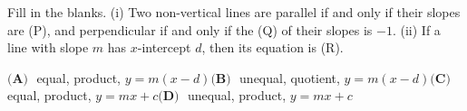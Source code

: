 Fill in the blanks. (i) Two non-vertical lines are parallel if and only if their slopes are (P)\underline{\hspace{1.5cm}}, and perpendicular if and only if the (Q)\underline{\hspace{1.5cm}} of their slopes is $-1$. (ii) If a line with slope $m$ has $x$-intercept $d$, then its equation is (R)\underline{\hspace{1.5cm}}.

$\textbf{(A) }$ equal, product, $y=m(x-d)$\qquad $\textbf{(B) }$ unequal, quotient, $y=m(x-d)$\qquad $\textbf{(C) }$ equal, product, $y=mx+c$\qquad $\textbf{(D) }$ unequal, product, $y=mx+c$
